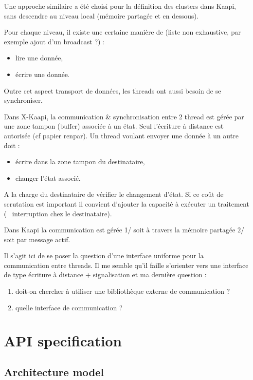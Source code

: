 \documentclass[12pt]{report}
\begin{document}
Une approche similaire a été choisi pour la définition des clusters dans Kaapi, sans descendre au niveau local (mémoire partagée et en dessous).

Pour chaque niveau, il existe une certaine manière de (liste non exhaustive, par exemple ajout d'un broadcast ?) :
\begin{itemize}
	\item lire une donnée,
	\item écrire une donnée.
\end{itemize}	
Outre cet aspect transport de données, les threads ont aussi besoin de se synchroniser.

Dans X-Kaapi, la communication \& synchronisation entre 2 thread est gérée par une zone tampon (buffer) associée à un état. Seul l'écriture à distance est autorisée (cf papier renpar). Un thread voulant envoyer une donnée à un autre doit :
\begin{itemize}	
	\item écrire dans la zone tampon du destinataire,
	\item changer l'état associé.
\end{itemize}	
A la charge du destinataire de vérifier le changement d'état. Si ce coût de scrutation est important il convient d'ajouter la capacité à exécuter un traitement (~ interruption chez le destinataire). 

Dans Kaapi la communication est gérée 1/ soit à travers la mémoire partagée 2/ soit par message actif. 

Il s'agit ici de se poser la question d'une interface uniforme pour la communication entre threads. Il me semble qu'il faille s'orienter vers une interface de type écriture à distance + signalisation et ma dernière question :
\begin{enumerate}[label=\textbf{Q \theenumi.},ref=\textbf{Q \theenumi},resume]
	\item doit-on chercher à utiliser une bibliothèque externe de communication ?
	\item quelle interface de communication ?
\end{enumerate}


\newpage
\chapter{API specification}

\section{Architecture model}
\end{document}

